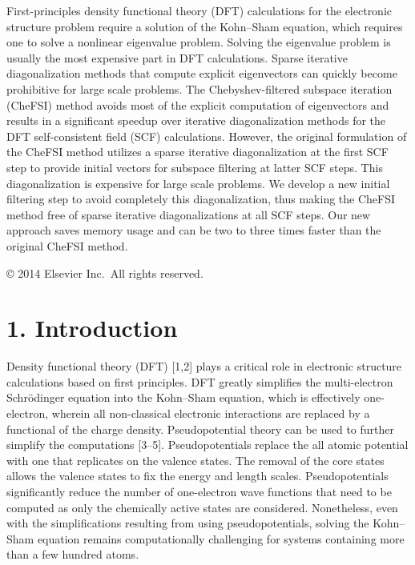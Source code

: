 \documentclass[
  10
]{article}
\begin{document}
First-principles density functional theory (DFT) calculations for the
electronic structure problem require a solution of the Kohn--Sham
equation, which requires one to solve a nonlinear eigenvalue problem.
Solving the eigenvalue problem is usually the most expensive part in DFT
calculations. Sparse iterative diagonalization methods that compute
explicit eigenvectors can quickly become prohibitive for large scale
problems. The Chebyshev-filtered subspace iteration (CheFSI) method
avoids most of the explicit computation of eigenvectors and results in a
significant speedup over iterative diagonalization methods for the DFT
self-consistent field (SCF) calculations. However, the original
formulation of the CheFSI method utilizes a sparse iterative
diagonalization at the first SCF step to provide initial vectors for
subspace filtering at latter SCF steps. This diagonalization is
expensive for large scale problems. We develop a new initial filtering
step to avoid completely this diagonalization, thus making the CheFSI
method free of sparse iterative diagonalizations at all SCF steps. Our
new approach saves memory usage and can be two to three times faster
than the original CheFSI method.

© 2014 Elsevier Inc.~All rights reserved.

\section{1. Introduction}\label{introduction}

Density functional theory (DFT) {[}1,2{]} plays a critical role in
electronic structure calculations based on first principles. DFT greatly
simplifies the multi-electron Schrödinger equation into the Kohn--Sham
equation, which is effectively one-electron, wherein all non-classical
electronic interactions are replaced by a functional of the charge
density. Pseudopotential theory can be used to further simplify the
computations {[}3--5{]}. Pseudopotentials replace the all atomic
potential with one that replicates on the valence states. The removal of
the core states allows the valence states to fix the energy and length
scales. Pseudopotentials significantly reduce the number of one-electron
wave functions that need to be computed as only the chemically active
states are considered. Nonetheless, even with the simplifications
resulting from using pseudopotentials, solving the Kohn--Sham equation
remains computationally challenging for systems containing more than a
few hundred atoms.
\end{document}
